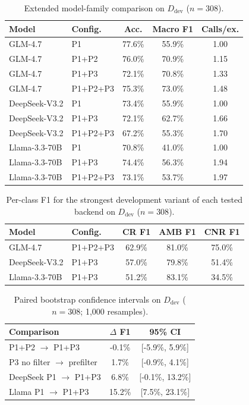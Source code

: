 \documentclass[11pt]{article}
\newcommand{\rev}[1]{#1}
\begin{document}
\begin{table}[ht]
\centering
\small
\setlength{\tabcolsep}{4pt}
\renewcommand{\arraystretch}{1.08}
\begin{tabular}{llccc}
\toprule
\textbf{Model} & \textbf{Config.} & \textbf{Acc.} & \textbf{Macro F1} & \textbf{Calls/ex.} \\
\midrule
GLM-4.7 & P1 & 77.6\% & 55.9\% & 1.00 \\
GLM-4.7 & P1+P2 & 76.0\% & 70.9\% & 1.15 \\
GLM-4.7 & P1+P3 & 72.1\% & 70.8\% & 1.33 \\
GLM-4.7 & P1+P2+P3 & 75.3\% & 73.0\% & 1.48 \\
DeepSeek-V3.2 & P1 & 73.4\% & 55.9\% & 1.00 \\
DeepSeek-V3.2 & P1+P3 & 72.1\% & 62.7\% & 1.66 \\
DeepSeek-V3.2 & P1+P2+P3 & 67.2\% & 55.3\% & 1.70 \\
Llama-3.3-70B & P1 & 70.8\% & 41.0\% & 1.00 \\
Llama-3.3-70B & P1+P3 & 74.4\% & 56.3\% & 1.94 \\
Llama-3.3-70B & P1+P2+P3 & 73.1\% & 53.7\% & 1.97 \\
\bottomrule
\end{tabular}
\caption{Extended model-family comparison on $D_{\text{dev}}$ ($n{=}308$).}
\label{tab:full_models}
\end{table}

\begin{table}[ht]
\centering
\small
\setlength{\tabcolsep}{5pt}
\begin{tabular}{llccc}
\toprule
\textbf{Model} & \textbf{Config.} & \textbf{CR F1} & \textbf{AMB F1} & \textbf{CNR F1} \\
\midrule
GLM-4.7 & P1+P2+P3 & 62.9\% & 81.0\% & 75.0\% \\
DeepSeek-V3.2 & P1+P3 & 57.0\% & 79.8\% & 51.4\% \\
Llama-3.3-70B & P1+P3 & 51.2\% & 83.1\% & 34.5\% \\
\bottomrule
\end{tabular}
\caption{\rev{Per-class F1 for the strongest development variant of each tested backend} on $D_{\text{dev}}$ ($n{=}308$).}
\label{tab:per-class}
\end{table}

\begin{table}[ht]
\centering
\small
\setlength{\tabcolsep}{5pt}
\begin{tabular}{lcc}
\toprule
\textbf{Comparison} & \textbf{$\Delta$ F1} & \textbf{95\% CI} \\
\midrule
P1+P2 $\rightarrow$ P1+P3 & -0.1\% & [-5.9\%, 5.9\%] \\
P3 no filter $\rightarrow$ prefilter & 1.7\% & [-0.9\%, 4.1\%] \\
DeepSeek P1 $\rightarrow$ P1+P3 & 6.8\% & [-0.1\%, 13.2\%] \\
Llama P1 $\rightarrow$ P1+P3 & 15.2\% & [7.5\%, 23.1\%] \\
\bottomrule
\end{tabular}
\caption{\rev{Paired bootstrap confidence intervals} on $D_{\text{dev}}$ ($n{=}308$; 1,000 resamples).}
\label{tab:bootstrap}
\end{table}
\end{document}
